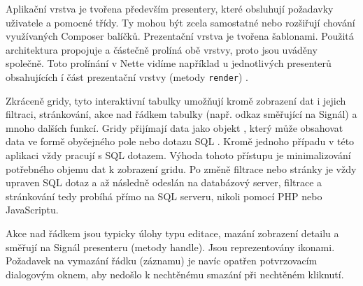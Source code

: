 Aplikační vrstva je tvořena především presentery, které obsluhují požadavky uživatele a pomocné třídy.  Ty mohou být zcela samostatné nebo rozšiřují chování využívaných Composer balíčků. Prezentační vrstva je tvořena šablonami. Použitá architektura propojuje a částečně prolíná obě vrstvy, proto jsou uváděny společně. Toto prolínání v Nette vidíme například u jednotlivých presenterů obsahujících í část prezentační vrstvy (metody \texttt{render}) .





 \label{section:Datagridy}
Zkráceně gridy, tyto interaktivní tabulky umožňují kromě zobrazení dat i jejich filtraci, stránkování, akce nad řádkem tabulky (např. odkaz směřující na Signál) a mnoho dalších funkcí. Gridy přijímají data jako objekt , který může obsahovat data ve formě obyčejného pole nebo dotazu SQL \cite{ContributteDataGrid}. Kromě jednoho případu v této aplikaci vždy pracují s SQL dotazem. Výhoda tohoto přístupu je minimalizování potřebného objemu dat k zobrazení gridu. Po změně filtrace nebo stránky je vždy upraven SQL dotaz a až následně odeslán na databázový server, filtrace a stránkování tedy probíhá přímo na SQL serveru, nikoli pomocí PHP nebo JavaScriptu.

Akce nad řádkem jsou typicky úlohy typu editace, mazání zobrazení detailu a směřují na Signál presenteru (metody handle). Jsou reprezentovány ikonami. Požadavek na vymazání řádku (záznamu) je navíc opatřen potvrzovacím dialogovým oknem, aby nedošlo k nechtěnému smazání při nechtěném kliknutí.
